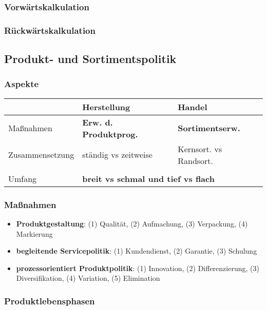 \subsubsection{Vorwärtskalkulation}
\subsubsection{Rückwärtskalkulation}

\subsection{Produkt- und Sortimentspolitik}


\subsubsection{Aspekte}

\begin{tabular}{lll}
	& Herstellung & Handel \\
	\hline
	Maßnahmen & {\bf Erw. d. Produktprog.} & {\bf Sortimentserw.} \\
	Zusammensetzung & ständig vs zeitweise & Kernsort. vs Randsort. \\
	{Struktur/\\Umfang} & \multicolumn{2}{l}{{\bf breit vs schmal und tief vs flach}} \\

\end{tabular}

\subsubsection{Maßnahmen}

\begin{itemize}
	\item {\bf Produktgestaltung}: (1) Qualität, (2) Aufmachung, (3) Verpackung, (4) Markierung
	\item {\bf begleitende Servicepolitik}: (1) Kundendienst, (2) Garantie, (3) Schulung
	\item {\bf prozessorientiert Produktpolitik}: (1) Innovation, (2) Differenzierung, (3) Diversifikation, (4) Variation, (5) Elimination
\end{itemize}

\subsubsection{Produktlebensphasen}

